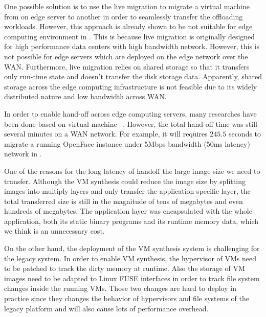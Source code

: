 One possible solution is to use the live migration\cite{vmlivemig} to migrate a virtual machine from on edge server to another in order to seamlessly transfer the offloading workloads. However, this approach is already shown to be not suitable for edge computing environment in  \cite{ha2015vmhandoff}. This is because live migration is originally designed for high performance data centers with high bandwidth network. However, this is not possible for edge servers which are deployed on the edge network over the WAN. Furthermore, live migration relies on shared storage so that it transfers only run-time state and doesn't transfer the disk storage data. Apparently, shared storage across the edge computing infrastructure is not feasible due to its widely distributed nature and low bandwidth across WAN. 

In order to enable hand-off across edge computing servers, many researches have been done based on virtual machine ~\cite{satya2009case,ha2015vmhandoff}. 
However,
the total hand-off time was still several minutes on a WAN network. For example, it will requires $245.5$ seconds to migrate a running OpenFace instance under 5Mbps bandwidth (50ms latency) network in \cite{ha2015vmhandoff}. 

One of the reasons for the long latency of handoff the large image size we need to transfer. Although the VM synthesis could reduce the image size by splitting images into multiply layers and only transfer the application-specific layer, the total transferred size is still in the magnitude of tens of megabytes and even hundreds of megabytes. 
The application layer was encapsulated with the whole application, both its static binary programs and its runtime memory data, which we think is an unnecessary cost. 

On the other hand, the deployment of the VM synthesis system is challenging for the legacy system. In order to enable VM synthesis, the hypervisor of VMs need to be patched to track the dirty memory at runtime. Also the storage of VM images need to be adapted to Linux FUSE interfaces in order to track file system changes inside the running VMs. Those two changes are hard to deploy in practice since they changes the behavior of hypervisors and file systems of the legacy platform and will also cause lots of performance overhead. 


